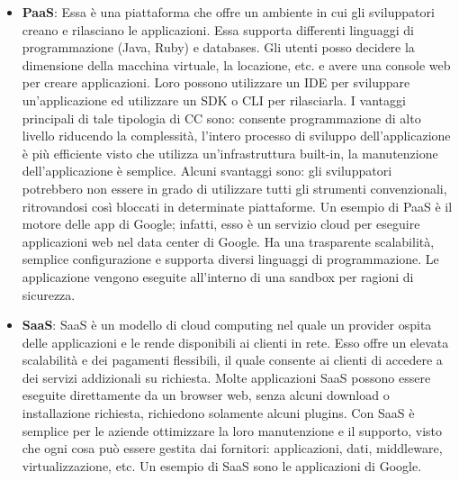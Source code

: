 \begin{itemize}
\item \textbf{PaaS}: Essa è una piattaforma che offre un ambiente in cui gli sviluppatori creano e rilasciano le applicazioni. Essa supporta differenti linguaggi di programmazione (Java, Ruby) e databases. Gli utenti posso decidere la dimensione della macchina virtuale, la locazione, etc. e avere una console web per creare applicazioni. Loro possono utilizzare un IDE per sviluppare un'applicazione ed utilizzare un SDK o CLI per rilasciarla. I vantaggi principali di tale tipologia di CC sono: consente programmazione di alto livello riducendo la complessità, l'intero processo di sviluppo dell'applicazione è più efficiente visto che utilizza un'infrastruttura built-in, la manutenzione dell'applicazione è semplice. Alcuni svantaggi sono: gli sviluppatori potrebbero non essere in grado di utilizzare tutti gli strumenti convenzionali, ritrovandosi così bloccati in determinate piattaforme. Un esempio di PaaS è il motore delle app di Google; infatti, esso è un servizio cloud per eseguire applicazioni web nel data center di Google. Ha una trasparente scalabilità, semplice configurazione e supporta diversi linguaggi di programmazione. Le applicazione vengono eseguite all'interno di una sandbox per ragioni di sicurezza.
\item \textbf{SaaS}: SaaS è un modello di cloud computing nel quale un provider ospita delle applicazioni e le rende disponibili ai clienti in rete. Esso offre un elevata scalabilità e dei pagamenti flessibili, il quale consente ai clienti di accedere a dei servizi addizionali su richiesta. Molte applicazioni SaaS possono essere eseguite direttamente da un browser web, senza alcuni download o installazione richiesta, richiedono solamente alcuni plugins. Con SaaS è semplice per le aziende ottimizzare la loro manutenzione e il supporto, visto che ogni cosa può essere gestita dai fornitori: applicazioni, dati, middleware, virtualizzazione, etc. Un esempio di SaaS sono le applicazioni di Google.
\end{itemize}
